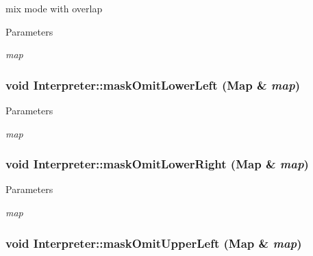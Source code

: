 mix mode with overlap 


\begin{DoxyParams}{Parameters}
\item[{\em map}]\end{DoxyParams}
\hypertarget{classInterpreter_a849719043f4eef44634a9b5eb3e3561e}{
\subsubsection[{maskOmitLowerLeft}]{\setlength{\rightskip}{0pt plus 5cm}void Interpreter::maskOmitLowerLeft ({\bf Map} \& {\em map})}}
\label{classInterpreter_a849719043f4eef44634a9b5eb3e3561e}

\begin{DoxyParams}{Parameters}
\item[{\em map}]\end{DoxyParams}
\hypertarget{classInterpreter_a5aab0968d1a9c62fd20e1f11446deb73}{
\subsubsection[{maskOmitLowerRight}]{\setlength{\rightskip}{0pt plus 5cm}void Interpreter::maskOmitLowerRight ({\bf Map} \& {\em map})}}
\label{classInterpreter_a5aab0968d1a9c62fd20e1f11446deb73}

\begin{DoxyParams}{Parameters}
\item[{\em map}]\end{DoxyParams}
\hypertarget{classInterpreter_a6232cdb6a8637bac127df9d19e8fd705}{
\subsubsection[{maskOmitUpperLeft}]{\setlength{\rightskip}{0pt plus 5cm}void Interpreter::maskOmitUpperLeft ({\bf Map} \& {\em map})}}
\label{classInterpreter_a6232cdb6a8637bac127df9d19e8fd705}

